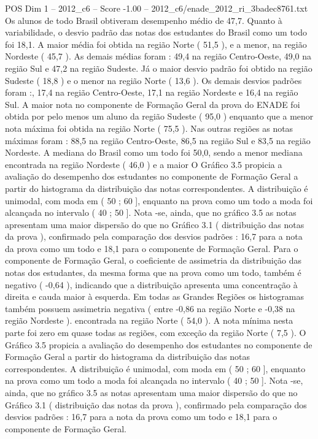 \begin{textsample}{POS Dim 1 – 2012\_c6 – Score -1.00 – 2012\_c6/enade\_2012\_ri\_3badec8761.txt}
Os alunos de todo Brasil obtiveram desempenho médio de 47,7.
Quanto à variabilidade, o desvio padrão das notas dos estudantes do Brasil como um todo foi 18,1.
A maior média foi obtida na região Norte ( 51,5 ), e a menor, na região Nordeste ( 45,7 ).
As demais médias foram : 49,4 na região Centro-Oeste, 49,0 na região Sul e 47,2 na região Sudeste.
Já o maior desvio padrão foi obtido na região Sudeste ( 18,8 ) e o menor na região Norte ( 13,6 ).
Os demais desvios padrões foram :, 17,4 na região Centro-Oeste, 17,1 na região Nordeste e 16,4 na região Sul.
A maior nota no componente de Formação Geral da prova do ENADE foi obtida por pelo menos um aluno da região Sudeste ( 95,0 ) enquanto que a menor nota máxima foi obtida na região Norte ( 75,5 ).
Nas outras regiões as notas máximas foram : 88,5 na região Centro-Oeste, 86,5 na região Sul e 83,5 na região Nordeste.
A mediana do Brasil como um todo foi 50,0, sendo a menor mediana encontrada na região Nordeste ( 46,0 ) e a maior O Gráfico 3.5 propicia a avaliação do desempenho dos estudantes no componente de Formação Geral a partir do histograma da distribuição das notas correspondentes.
A distribuição é unimodal, com moda em ( 50 ; 60 ], enquanto na prova como um todo a moda foi alcançada no intervalo ( 40 ; 50 ].
Nota -se, ainda, que no gráfico 3.5 as notas apresentam uma maior dispersão do que no Gráfico 3.1 ( distribuição das notas da prova ), confirmado pela comparação dos desvios padrões : 16,7 para a nota da prova como um todo e 18,1 para o componente de Formação Geral.
Para o componente de Formação Geral, o coeficiente de assimetria da distribuição das notas dos estudantes, da mesma forma que na prova como um todo, também é negativo ( -0,64 ), indicando que a distribuição apresenta uma concentração à direita e cauda maior à esquerda.
Em todas as Grandes Regiões os histogramas também possuem assimetria negativa ( entre -0,86 na região Norte e -0,38 na região Nordeste ). encontrada na região Norte ( 54,0 ).
A nota mínima nesta parte foi zero em quase todas as regiões, com exceção da região Norte ( 7,5 ).
O Gráfico 3.5 propicia a avaliação do desempenho dos estudantes no componente de Formação Geral a partir do histograma da distribuição das notas correspondentes.
A distribuição é unimodal, com moda em ( 50 ; 60 ], enquanto na prova como um todo a moda foi alcançada no intervalo ( 40 ; 50 ].
Nota -se, ainda, que no gráfico 3.5 as notas apresentam uma maior dispersão do que no Gráfico 3.1 ( distribuição das notas da prova ), confirmado pela comparação dos desvios padrões : 16,7 para a nota da prova como um todo e 18,1 para o componente de Formação Geral.

\end{textsample}
